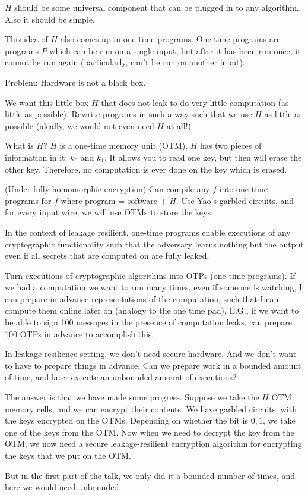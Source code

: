 \documentclass[10pt]{article}
\begin{document}
$H$ should be some universal component that can be plugged in to any algorithm. Also it should be simple.

This idea of $H$ also comes up in one-time programs. One-time programs are programs $P$ which can be run on a single input, but after it has been run once, it cannot be run again (particularly, can't be run on another input).

Problem: Hardware is not a black box.

We want this little box $H$ that does not leak to do very little computation (as little as possible). Rewrite programs in such a way such that we use $H$ as little as possible (ideally, we would not even need $H$ at all!)

What is $H$? $H$ is a one-time memory unit (OTM). $H$ has two pieces of information in it: $k_0$ and $k_1$. It allows you to read one key, but then will erase the other key. Therefore, no computation is ever done on the key which is erased.

\begin{theorem}
(Under fully homomorphic encryption) Can compile any $f$ into one-time programs for $f$ where program = software + $H$. Use Yao's garbled circuits, and for every input wire, we will use OTMs to store the keys.
\end{theorem}

In the context of leakage resilient, one-time programs enable executions of any cryptographic functionality such that the adversary learns nothing but the output even if all secrets that are computed on are fully leaked.

Turn executions of cryptographic algorithms into OTPs (one time programs). If we had a computation we want to run many times, even if someone is watching, I can prepare in advance representations of the computation, such that I can compute them online later on (analogy to the one time pad). E.G., if we want to be able to sign 100 messages in the presence of computation leaks, can prepare 100 OTPs in advance to accomplish this.

In leakage resilience setting, we don't need secure hardware. And we don't want to have to prepare things in advance. Can we prepare work in a bounded amount of time, and later execute an unbounded amount of executions?

The answer is that we have made some progress. Suppose we take the $H$ OTM memory cells, and we can encrypt their contents. We have garbled circuits, with the keys encrypted on the OTMs. Depending on whether the bit is $0, 1$, we take one of the keys from the OTM. Now when we need to decrypt the key from the OTM, we now need a secure leakage-resilient encryption algorithm for encrypting the keys that we put on the OTM.

But in the first part of the talk, we only did it a bounded number of times, and here we would need unbounded.


\nocite{*}


\end{document}
